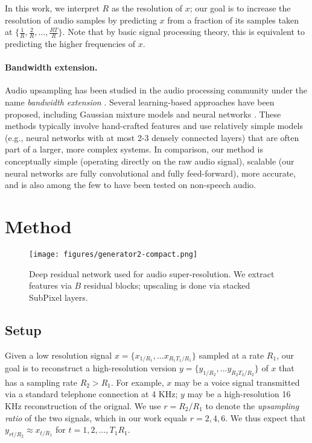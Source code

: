 \documentclass{article} \usepackage{iclr2017_workshop,times}
\begin{document}
In this work, we interpret $R$ as the resolution of $x$; our goal is to increase the resolution of audio samples by predicting $x$ from a fraction of its samples taken at $\{\frac{1}{R}, \frac{2}{R},..., \frac{RT}{R}\}$. Note that by basic signal processing theory, this is equivalent to predicting the higher frequencies of $x$.

\paragraph{Bandwidth extension.}

Audio upsampling has been studied in the audio processing community under the name {\em bandwidth extension} \citep{ekstrand2002bandwidth,larsen2005audio}. Several learning-based approaches have been proposed, including Gaussian mixture models \citep{cheng1994statistical, park2000narrowband} and neural networks \citep{li2015dnn}. These methods typically involve hand-crafted features and use relatively simple models (e.g., neural networks with at most 2-3 densely connected layers) that are often part of a larger, more complex systems. 
In comparison, our method is conceptually simple (operating directly on the raw audio signal), scalable (our neural networks are fully convolutional and fully feed-forward), more accurate, and is also among the few to have been tested on non-speech audio.





\section{Method}

\begin{figure}[t]
\vspace{-7mm}
\begin{center}
\texttt{[image: figures/generator2-compact.png]}
\end{center}
\caption{Deep residual network used for audio super-resolution. We extract features via $B$ residual blocks; upscaling is done via stacked SubPixel layers.}
\end{figure}

\subsection{Setup}

Given a low resolution signal $x = \{x_{1/R_1}, ... x_{R_1 T_1 / R_1}\}$ sampled at a rate $R_1$, our goal is to reconstruct a high-resolution version $y = \{y_{1 / R_2}, ... y_{R_2 T_2 / R_2}\}$ of $x$ that has a sampling rate $R_2 > R_1$. For example, $x$ may be a voice signal transmitted via a standard telephone connection at 4 KHz; $y$ may be a high-resolution 16 KHz reconstruction of the orignal.
We use $r = R_2/R_1$ to denote the {\em upsampling ratio} of the two signals, which in our work equals $r=2,4,6$. We thus expect that $y_{r t / R_2} \approx x_{t / R_1}$ for $t = 1,2,...,T_1 R_1$.
\end{document}
